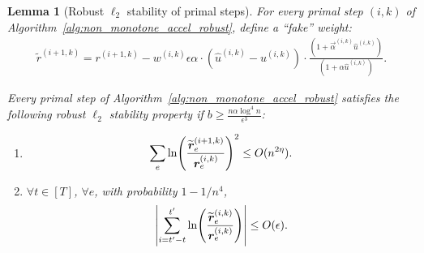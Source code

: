\documentclass[11pt]{article}
\newtheorem{lemma}[theorem]{Lemma}
\let\originalleft\left
\let\originalright\right
\renewcommand{\left}{\mathopen{}\mathclose\bgroup\originalleft}
\renewcommand{\right}{\aftergroup\egroup\originalright}
\newcommand\rr{\boldsymbol{\mathit{r}}}
\newcommand\uu{\boldsymbol{\mathit{u}}}
\newcommand\ww{\boldsymbol{\mathit{w}}}
\newcommand{\wh}{\widehat}
\newcommand{\wt}{\widetilde}
\begin{document}
\begin{lemma}[Robust $\ell_2$ stability of primal steps]
For every primal step $(i,k)$ of Algorithm~\ref{alg:non_monotone_accel_robust}, define a ``fake'' weight:
\begin{align}\label{eq:def_tilde_r}
\wt{\rr}^{(i+1,k)} = \rr^{(i+1,k)} - \ww^{(i,k)} \epsilon \alpha \cdot ( \wh{\uu}^{(i,k)} - \uu^{(i,k)}) \cdot \frac{(1 + \overrightarrow{\alpha}^{(i,k)} \wh{\uu}^{(i,k)})}{(1 + \alpha \wh{\uu}^{(i,k)})}.
\end{align}

Every primal step of Algorithm~\ref{alg:non_monotone_accel_robust} satisfies the following robust $\ell_2$ stability property if $b \geq \frac{n \alpha \log^4 n}{\epsilon^3}$: 
\begin{enumerate}
    \item 
    \[
    \sum_e \ln\left(\frac{\wt{\rr}_e^{(i+1,k)}}{\rr_e^{(i,k)}}\right)^2 \leq O(n^{2\eta}). 
    \]
    \item $\forall t \in [T]$, $\forall e$, with probability $1 - 1/n^4$,
    \[
    \left|\sum_{i = t'-t}^{t'} \ln\left(\frac{\wt{\rr}_e^{(i,k)}}{\rr_e^{(i,k)}}\right)\right| \leq O(\epsilon). 
    \]
\end{enumerate}
\end{lemma}
\end{document}
